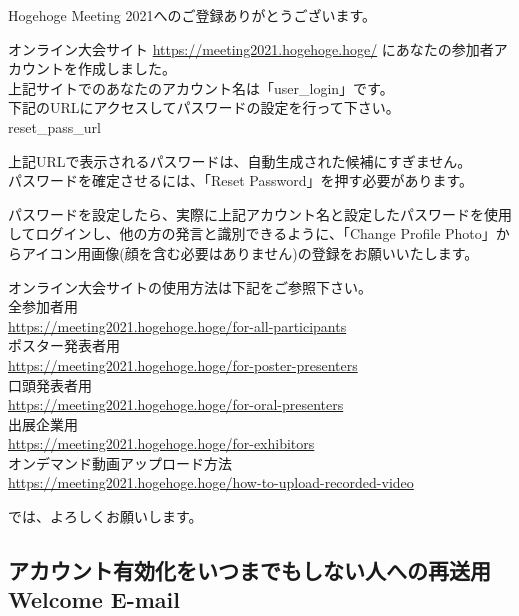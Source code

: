 \documentclass[titlepage,10pt,a4paper,uplatex]{jsbook}
\newenvironment{content}{\begin{shaded}\vspace{-1em}\raggedright\ttfamily\footnotesize\setlength{\baselineskip}{1.4em}}{\end{shaded}\vspace{-1em}}
\begin{document}
\begin{content}
Hogehoge Meeting 2021へのご登録ありがとうございます。

オンライン大会サイト \url{https://meeting2021.hogehoge.hoge/} にあなたの参加者アカウントを作成しました。\\
上記サイトでのあなたのアカウント名は「{\lbrack}user\_login{\rbrack}」です。\\
下記のURLにアクセスしてパスワードの設定を行って下さい。\\
{\lbrack}reset\_pass\_url{\rbrack}

上記URLで表示されるパスワードは、自動生成された候補にすぎません。\\
パスワードを確定させるには、「Reset Password」を押す必要があります。

パスワードを設定したら、実際に上記アカウント名と設定したパスワードを使用してログインし、他の方の発言と識別できるように、「Change Profile Photo」からアイコン用画像(顔を含む必要はありません)の登録をお願いいたします。

オンライン大会サイトの使用方法は下記をご参照下さい。\\
全参加者用\\
\url{https://meeting2021.hogehoge.hoge/for-all-participants}\\
ポスター発表者用\\
\url{https://meeting2021.hogehoge.hoge/for-poster-presenters}\\
口頭発表者用\\
\url{https://meeting2021.hogehoge.hoge/for-oral-presenters}\\
出展企業用\\
\url{https://meeting2021.hogehoge.hoge/for-exhibitors}\\
オンデマンド動画アップロード方法\\
\url{https://meeting2021.hogehoge.hoge/how-to-upload-recorded-video}

では、よろしくお願いします。
\end{content}

\subsection{アカウント有効化をいつまでもしない人への再送用Welcome E-mail}
\end{document}
